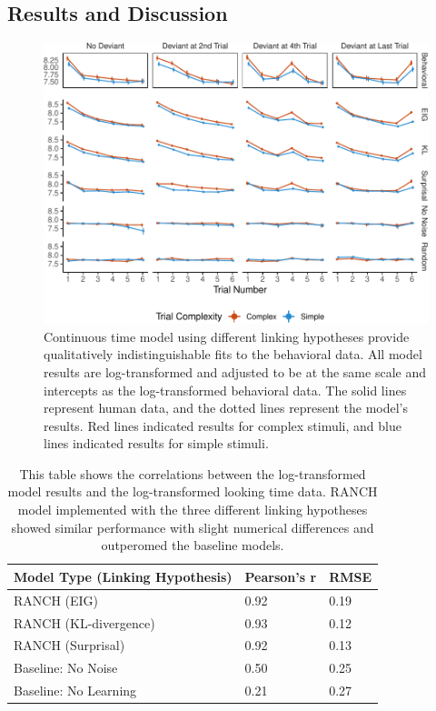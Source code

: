 \documentclass[10pt, letterpaper]{article}
\newenvironment{CodeChunk}{}{}
\begin{document}
\hypertarget{results-and-discussion}{%
\subsection{Results and Discussion}\label{results-and-discussion}}

\begin{CodeChunk}
\begin{figure}[t!]

{\centering \includegraphics{figs/experiment_res-1} 

}

\caption[Continuous time model using different linking hypotheses provide qualitatively indistinguishable fits to the behavioral data]{Continuous time model using different linking hypotheses provide qualitatively indistinguishable fits to the behavioral data. All model results are log-transformed and adjusted to be at the same scale and intercepts as the log-transformed behavioral data. The solid lines represent human data, and the dotted lines represent the model's results. Red lines indicated results for complex stimuli, and blue lines indicated results for simple stimuli.}\label{fig:experiment_res}
\end{figure}
\end{CodeChunk}

\begin{table}[ht]
\centering
\begin{tabular}{lll}
  \hline
Model Type (Linking Hypothesis) & Pearson's r & RMSE \\ 
  \hline
RANCH (EIG) & 0.92 & 0.19 \\ 
  RANCH (KL-divergence) & 0.93 & 0.12 \\ 
  RANCH (Surprisal) & 0.92 & 0.13 \\ 
  Baseline: No Noise & 0.50 & 0.25 \\ 
  Baseline: No Learning & 0.21 & 0.27 \\ 
   \hline
\end{tabular}
\caption{This table shows the correlations between the log-transformed model results and the log-transformed looking time data. RANCH model implemented with the three different linking hypotheses showed similar performance with slight numerical differences and outperomed the baseline models.} 
\end{table}
\end{document}
